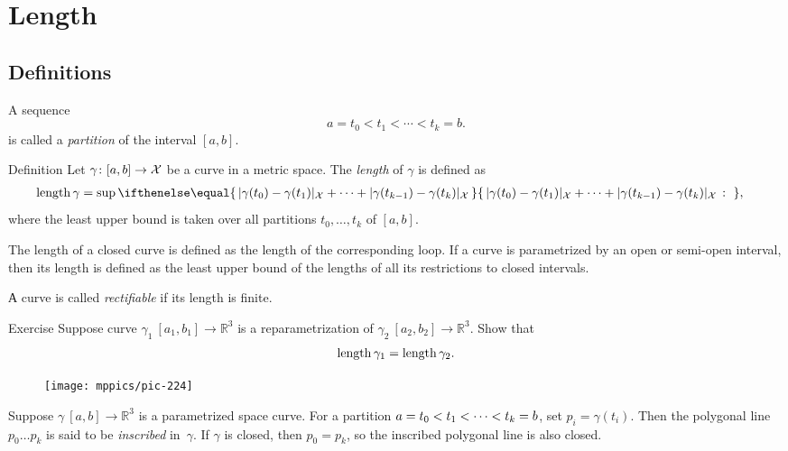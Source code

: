 \chapter{Length}
\label{chap:length}

\section{Definitions}

A sequence 
\[a=t_0 < t_1 < \cdots < t_k=b.\]
is called a \emph{partition} of the interval $[a,b]$.

\begin{thm}{Definition}\label{def:length}
Let $\gamma\colon[a,b]\to \mathcal{X}$ be a curve in a metric space.
The \emph{length} of $\gamma$ is defined as
\begin{align*}
\length \gamma
&= 
\sup
\set{\dist{\gamma(t_0)}{\gamma(t_1)}{\spc{X}}
+\dots+
\dist{\gamma(t_{k-1})}{\gamma(t_k)}{\spc{X}}}{},
\end{align*}
where the least upper bound is taken over all partitions $t_0,\dots,t_k$ of $[a,b]$.

The length of a closed curve is defined as the length of the corresponding loop.
If a curve is parametrized by an open or semi-open interval, then its length is defined as the least upper bound of the lengths of all its restrictions to closed intervals.
 
\end{thm}

А curve is called \emph{rectifiable} if its length is finite.

\begin{thm}{Exercise}\label{ex:integral-length-0}
Suppose curve $\gamma_1\:[a_1,b_1] \to\mathbb{R}^3$ is a reparametrization of $\gamma_2\:[a_2,b_2] \to\mathbb{R}^3$. 
Show that
\[\mathop{\rm length}\nolimits \gamma_1 = \mathop{\rm length}\nolimits \gamma_2.\]

\end{thm}

\begin{wrapfigure}[4]{r}{33 mm}
\vskip-4mm
\centering
\texttt{[image: mppics/pic-224]}
\end{wrapfigure}

Suppose $\gamma\:[a,b]\to \mathbb{R}^3$ is a parametrized space curve.
For a partition $a=t_0 < t_1 < \z\cdots < t_k=b$, set $p_i=\gamma(t_i)$.
Then the polygonal line $p_0\dots p_k$ is said to be \emph{inscribed} in~$\gamma$.
If $\gamma$ is closed, then $p_0=p_k$, so the inscribed polygonal line is also closed.

